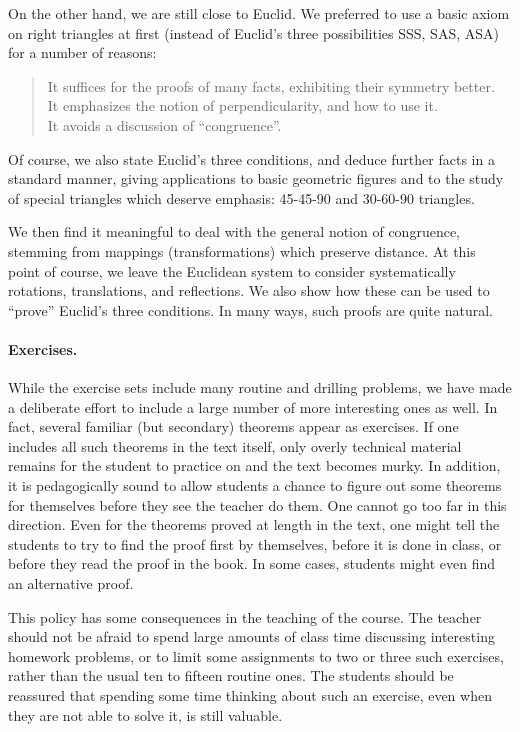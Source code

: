 \documentclass[12pt]{book} %
\begin{document}
On the other hand, we are still close to Euclid. We preferred to use a basic axiom on right triangles at first (instead of Euclid's three possibilities SSS, SAS, ASA) for a number of reasons:
\begin{quote}
	It suffices for the proofs of many facts, exhibiting their symmetry better.\\
	It emphasizes the notion of perpendicularity, and how to use it.\\
	It avoids a discussion of ``congruence''.
\end{quote}

Of course, we also state Euclid's three conditions, and deduce further facts in a standard manner, giving applications to basic geometric figures and to the study of special triangles which deserve emphasis: 45-45-90 and 30-60-90 triangles.

We then find it meaningful to deal with the general notion of congruence, stemming from mappings (transformations) which preserve distance. At this point of course, we leave the Euclidean system to consider systematically rotations, translations, and reflections. We also show how these can be used to ``prove'' Euclid's three conditions. In many ways, such proofs are quite natural.

\paragraph{Exercises.}
While the exercise sets include many routine and drilling problems, we have made a deliberate effort to include a large number of more interesting ones as well. In fact, several familiar (but secondary) theorems appear as exercises. If one includes all such theorems in the text itself, only overly technical material remains for the student to practice on and the text becomes murky. In addition, it is pedagogically sound to allow students a chance to figure out some theorems for themselves before they see the teacher do them. One cannot go too far in this direction. Even for the theorems proved at length in the text, one might tell the students to try to find the proof first by themselves, before it is done in class, or before they read the proof in the book. In some cases, students might even find an alternative proof.

This policy has some consequences in the teaching of the course. The teacher should not be afraid to spend large amounts of class time discussing interesting homework problems, or to limit some assignments to two or three such exercises, rather than the usual ten to fifteen routine ones. The students should be reassured that spending some time thinking about such an exercise, even when they are not able to solve it, is still valuable.
\end{document}
